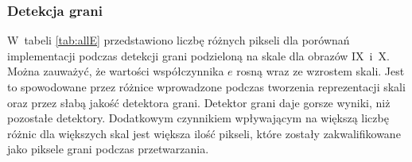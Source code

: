 \subsubsection{Detekcja grani}
\label{subsubsec:granieTabele}

W~tabeli \ref{tab:allE} przedstawiono liczbę różnych pikseli dla porównań implementacji podczas detekcji grani podzieloną na skale dla obrazów IX~i~X. Można zauważyć, że wartości współczynnika $ e $ rosną wraz ze wzrostem skali. Jest to spowodowane przez różnice wprowadzone podczas tworzenia reprezentacji skali oraz przez słabą jakość detektora grani. Detektor grani daje gorsze wyniki, niż pozostałe detektory. Dodatkowym czynnikiem wpływającym na większą liczbę różnic dla większych skal jest większa ilość pikseli, które zostały zakwalifikowane jako piksele grani podczas przetwarzania.

